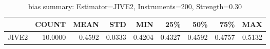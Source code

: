 \begin{table}[ht]
\centering
\caption{bias summary: Estimator=JIVE2, Instruments=200, Strength=0.30}
\begin{tabular}{lrrrrrrrr}
\toprule
 & COUNT & MEAN & STD & MIN & 25\% & 50\% & 75\% & MAX \\
\midrule
JIVE2 & 10.0000 & 0.4592 & 0.0333 & 0.4204 & 0.4327 & 0.4592 & 0.4757 & 0.5132 \\
\bottomrule
\end{tabular}
\end{table}
